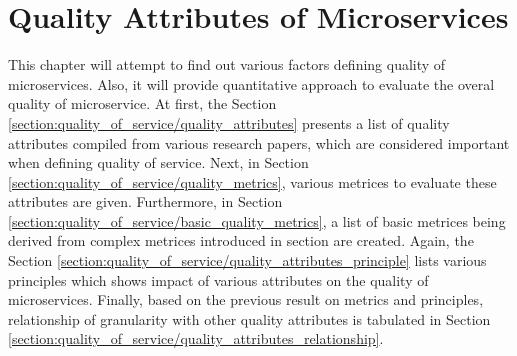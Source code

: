 
\begin{comment}
comment from Manoj
- try to reference ISO/IEC 9126 for the quality attributes: refer to the slides sent by Manoj on Nov 02
- Also include the formula of the metrics and discuss about them and simplify them: refer to the slides sent by Manoj on Nov 02
- The quality attributes which can make more sense according to the priority to microservices: refer to the slides sent by Manoj on Nov 02
- Relationship between the quality attributes and their tradeoffs, what happens when we try to increase cohesion.. how it affect other attributes?
- create wiki page in the sebis page to document the literature review.

comment from Andrea
- mention about coupling created by calling same database directly by multiple microservice
use the formula to calculate quality metrics for the services at hybris to give an idea about good and bad service, the process of finding out good service at first and then using the quality metrics finding out the range of quality metrics, which can then be used to identify bad services
\end{comment}



\chapter{Quality Attributes of Microservices}\label{chapter:quality_of_service}
This chapter will attempt to find out various factors defining quality of microservices. Also, it will provide quantitative approach to evaluate the overal quality of microservice. At first, the Section \ref{section:quality_of_service/quality_attributes} presents a list of quality attributes compiled from various research papers, which are considered important when defining quality of service. Next, in Section \ref{section:quality_of_service/quality_metrics}, various metrices to evaluate these attributes are given. Furthermore, in Section \ref{section:quality_of_service/basic_quality_metrics}, a list of basic metrices being derived from complex metrices introduced in section are created. Again, the Section \ref{section:quality_of_service/quality_attributes_principle} lists various principles which shows impact of various attributes on the quality of microservices. Finally, based on the previous result on metrics and principles, relationship of granularity with other quality attributes is tabulated in Section \ref{section:quality_of_service/quality_attributes_relationship}.

